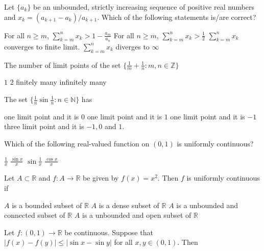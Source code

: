 \documentclass[10pt]{exam}
\newcommand{\R}{\ensuremath{\mathbb{R}}}
\begin{document}
\begin{questions}
\question 
Let $\{a_k \}$ be an unbounded, strictly increasing sequence of positive real numbers and $x_k = (a_{k+1} - a_k )/a_{k + 1}$. Which of the following statements is/are correct?

\begin{checkboxes}
\choice For all $n \geq m$, $\sum_{k=m}^n x_k > 1 - \frac{a_m}{a_n}$ 
\choice For all $n \geq m$, $\sum_{k=m}^n x_k > \frac{1}{2}$ 
\choice $\sum_{k=m}^n x_k $ converges to finite limit. 
\choice $\sum_{k=m}^n x_k $ diverges to $\infty$  
\end{checkboxes}

\question
The number of limit points of the set $\{ \frac{1}{m}+\frac{1}{n}:m,n \in \mathbb{Z} \}$

\begin{choices}
\choice $1$
\choice $2$
\choice finitely many 
\choice infinitely many  
\end{choices}


\question
The set $\{\frac{1}{n} \sin \frac{1}{n}:n \in \mathbb{N} \}$ has 
\begin{choices}
\choice one limit point and it is $0$ 
\choice one limit point and it is $1$
\choice one limit point and it is $-1$
\choice three limit point and it is $-1,0$ and $1$.
\end{choices}



\question
Which of the following real-valued function on $(0,1)$ is uniformly  continuous?

\begin{oneparchoices}
\choice $\frac{1}{x}$
\choice $\frac{\sin x}{x}$
\choice $\sin \frac{1}{x}$
\choice $\frac{\cos x}{x}$
\end{oneparchoices}


\question 
Let $A \subset \R$ and $f:A \rightarrow \R$ be given by $f(x) = x^2$. Then $f$ is uniformly continuous if 

\begin{choices}
\choice $A$ is a bounded                 subset of $\R$ 
\choice $A$ is a dense                   subset of $\R$ 
\choice $A$ is a unbounded and connected subset of $\R$ 
\choice $A$ is a unbounded and open      subset of $\R$ 
\end{choices}


\question 
Let $f:(0,1) \rightarrow \R$ be continuous. Suppose that $|f(x) - f(y)| \leq |\sin x - \sin y|$ for all $x, y \in (0,1)$. Then 


\end{questions}
\end{document}
